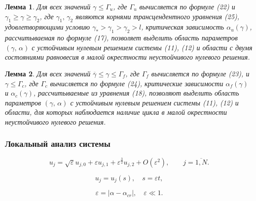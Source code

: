 \documentclass[fullscreen=true, unicode, bookmarks=false]{beamer}
\newtheorem{ruslemma}{Лемма }[subsection]
\begin{document}
\begin{frame}

\begin{ruslemma}
Для всех значений $\gamma \leqslant \Gamma_u$, где $\Gamma_u$ вычисляется по формуле (22) и $\gamma_1 \geqslant \gamma \geqslant \gamma_2$, где $\gamma_1, \, \gamma_2$ являются корнями трансцендентного уравнения (25), удовлетворяющими условию $\gamma_* > \gamma_1 > \gamma_2 > l$, критическая зависимость $\alpha_u(\gamma)$, рассчитываемая по формуле (17), позволяет выделить область параметров $(\gamma, \, \alpha)$ с устойчивым нулевым решением системы (11), (12) и области с двумя состояниями равновесия в малой окрестности неустойчивого нулевого решения.
\end{ruslemma}

\begin{ruslemma}
Для всех значений $\overline{\gamma} \leqslant \gamma \leqslant \Gamma_f$, где $\Gamma_f$ вычисляется по формуле (23), и $\gamma \leqslant \Gamma_c$, где $\Gamma_c$ вычисляется по формуле (24), критические зависимости $\alpha_f(\gamma)$ и $\alpha_c(\gamma)$, рассчитываемые из уравнения (18), позволяют выделить область параметров $(\gamma, \, \alpha)$ с устойчивым нулевым решением системы (11), (12) и области, для которых наблюдается наличие цикла в малой окрестности неустойчивого нулевого решения.
\end{ruslemma}

\end{frame}

\begin{frame}
\frametitle{ Локальный анализ системы }

\begin{equation}
	u_j = \sqrt{\varepsilon}u_{j,0} + \varepsilon u_{j,1} + \varepsilon^{\frac{3}{2}} u_{j,2} + O(\varepsilon^2), \qquad j = \overline{1, N}.
\end{equation}

\bigskip

$$ u_j = u_j(s), \quad s = \varepsilon t, $$

$$ \varepsilon = | \alpha - \alpha_{cr} |, \quad \varepsilon \ll 1.  $$

\end{frame}
\end{document}
